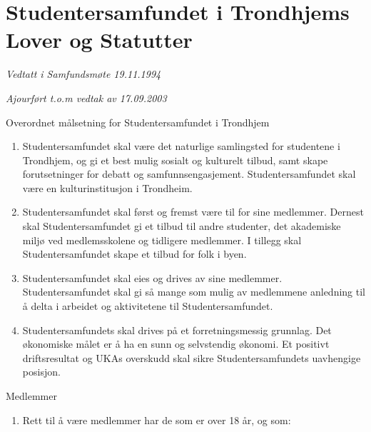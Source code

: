 \documentclass[fsbok.tex]{subfiles}
\begin{document}
\chapter*{Studentersamfundet i Trondhjems Lover og Statutter}

\emph{Vedtatt i Samfundsmøte 19.11.1994}

\emph{Ajourført t.o.m vedtak av 17.09.2003}



\begin{lovkapittel}{}

\begin{lovparagraf}{Overordnet målsetning for Studentersamfundet i Trondhjem}

    \begin{enumerate}
        \item Studentersamfundet skal være det naturlige samlingsted for studentene i Trondhjem, og gi
            et best mulig sosialt og kulturelt tilbud, samt skape forutsetninger for debatt og
            samfunnsengasjement. Studentersamfundet skal være en kulturinstitusjon i Trondheim.
        \item Studentersamfundet skal først og fremst være til for sine medlemmer. Dernest
            skal Studentersamfundet gi et tilbud til andre studenter, det akademiske miljø
            ved medlemsskolene og tidligere medlemmer. I tillegg skal Studentersamfundet
            skape et tilbud for folk i byen.
	\item Studentersamfundet skal eies og drives av sine medlemmer. Studentersamfundet skal gi så mange som mulig 
	av medlemmene anledning til å delta i arbeidet og aktivitetene til Studentersamfundet.
	\item Studentersamfundets skal drives på et forretningsmessig grunnlag. Det økonomiske målet er å ha en sunn og 
	selvstendig økonomi. Et positivt driftsresultat og UKAs overskudd skal sikre Studentersamfundets
	uavhengige posisjon.

    \end{enumerate}
\end{lovparagraf}





\begin{lovparagraf}{Medlemmer}

  \begin{enumerate}
    \item Rett til å være medlemmer har de som er over 18 år, og som:
      

\end{enumerate}
\end{lovparagraf}
\end{lovkapittel}
\end{document}
